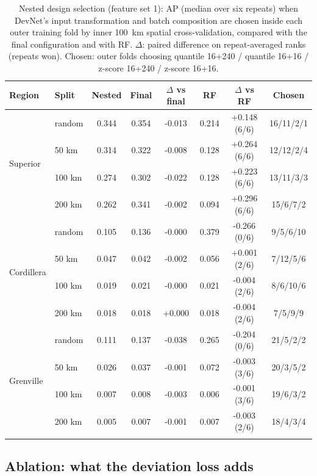 \documentclass[pdflatex,sn-apa]{sn-jnl}
\begin{document}
\begin{table}[t]
\caption{Nested design selection (feature set 1): AP (median over six repeats) when DevNet's input transformation and batch composition are chosen inside each outer training fold by inner 100~km spatial cross-validation, compared with the final configuration and with RF. $\Delta$: paired difference on repeat-averaged ranks (repeats won). Chosen: outer folds choosing quantile 16+240 / quantile 16+16 / z-score 16+240 / z-score 16+16.}\label{tab:nested}
\scriptsize
\setlength{\tabcolsep}{2.5pt}
\begin{tabular*}{\textwidth}{@{\extracolsep\fill}llcccccc}
\toprule
Region & Split & Nested & Final & $\Delta$ vs final & RF & $\Delta$ vs RF & Chosen \\
\midrule
\multirow{4}{*}{Superior} & random & 0.344 & 0.354 & -0.013 & 0.214 & +0.148 (6/6) & 16/11/2/1 \\
 & 50 km & 0.314 & 0.322 & -0.008 & 0.128 & +0.264 (6/6) & 12/12/2/4 \\
 & 100 km & 0.274 & 0.302 & -0.022 & 0.128 & +0.223 (6/6) & 13/11/3/3 \\
 & 200 km & 0.262 & 0.341 & -0.002 & 0.094 & +0.296 (6/6) & 15/6/7/2 \\
\midrule
\multirow{4}{*}{Cordillera} & random & 0.105 & 0.136 & -0.000 & 0.379 & -0.266 (0/6) & 9/5/6/10 \\
 & 50 km & 0.047 & 0.042 & -0.002 & 0.056 & +0.001 (2/6) & 7/12/5/6 \\
 & 100 km & 0.019 & 0.021 & -0.000 & 0.021 & -0.004 (2/6) & 8/6/10/6 \\
 & 200 km & 0.018 & 0.018 & +0.000 & 0.018 & -0.004 (2/6) & 7/5/9/9 \\
\midrule
\multirow{4}{*}{Grenville} & random & 0.111 & 0.137 & -0.038 & 0.265 & -0.204 (0/6) & 21/5/2/2 \\
 & 50 km & 0.026 & 0.037 & -0.001 & 0.072 & -0.003 (3/6) & 20/3/5/2 \\
 & 100 km & 0.007 & 0.008 & -0.003 & 0.006 & -0.001 (3/6) & 19/6/3/2 \\
 & 200 km & 0.005 & 0.007 & -0.001 & 0.007 & -0.003 (2/6) & 18/4/3/4 \\
\botrule
\end{tabular*}
\end{table}

\subsection{Ablation: what the deviation loss adds}\label{sec:res-ablation}
\end{document}
